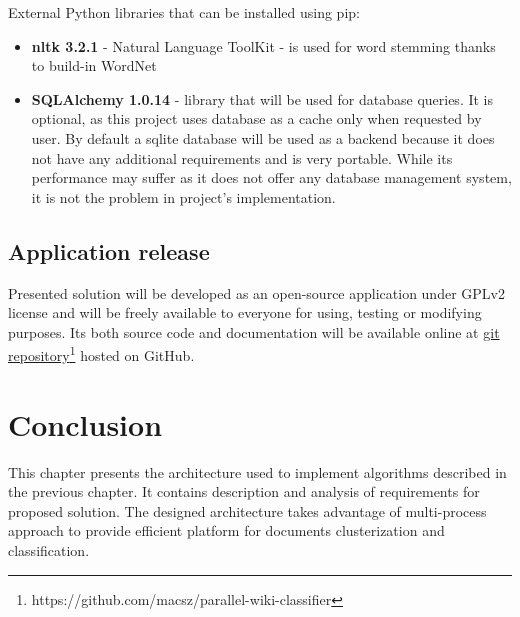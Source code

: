 External Python libraries that can be installed using pip:
\begin{itemize}
	\item \textbf{nltk 3.2.1} - Natural Language ToolKit - is used for word stemming thanks to build-in WordNet
	\item \textbf{SQLAlchemy 1.0.14} - library that will be used for database queries. It is optional, as this project uses database as a cache only when requested by user. By default a sqlite database will be used as a backend because it does not have any additional requirements and is very portable. While its performance may suffer as it does not offer any database management system, it is not the problem in project's implementation.
\end{itemize}


\subsection{Application release}
Presented solution will be developed as an open-source application under GPLv2 license and will be freely available to everyone for using, testing or modifying purposes. Its both source code and documentation will be available online at \href{https://github.com/macsz/parallel-wiki-classifier}{git repository\footnote{https://github.com/macsz/parallel-wiki-classifier} hosted on GitHub}.


\section{Conclusion}
This chapter presents the architecture used to implement algorithms described in the previous chapter. It contains description and analysis of requirements for proposed solution. The designed architecture takes advantage of multi-process approach to provide efficient platform for documents clusterization and classification.

